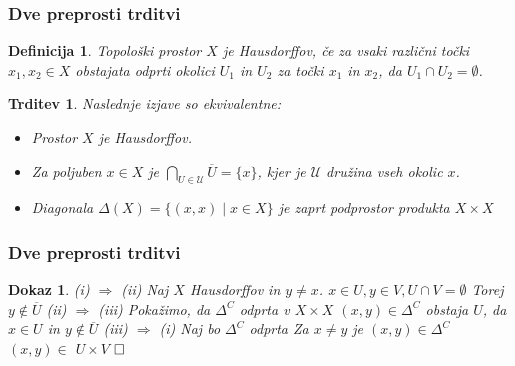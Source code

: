 \documentclass{beamer}
\def\qed{$\hfill\Box$}   %
\newtheorem{trditev}{Trditev}
\newtheorem{definicija}{Definicija}
\newtheorem{dokaz}{Dokaz}
\begin{document}
\begin{frame}
\frametitle{Dve preprosti trditvi}

\begin{definicija}
    Topološki prostor $X$ je \emph{Hausdorffov}, če za vsaki različni točki $x_1, x_2 \in X$ obstajata odprti okolici $U_1$ in $U_2$ za točki $x_1$ in $x_2$, da $U_1 \cap U_2 = \emptyset$.
\end{definicija}
\pause

\begin{trditev}
    Naslednje izjave so ekvivalentne:
    \pause
    \begin{itemize}
        \item[\rm (i)] Prostor $X$ je Hausdorffov.
        \pause 
        \item[\rm (ii)] Za poljuben $x \in X$ je $\bigcap_{U \in \mathcal{U}} \overline{U} = \{x\}$, kjer je $\mathcal{U}$ družina vseh okolic $x$.
        \pause 
        \item[\rm (iii)] Diagonala $\Delta(X) = \{(x,x) \mid x \in X \} $ je zaprt podprostor produkta $X \times X$
    \end{itemize}
\end{trditev}

\end{frame}

\begin{frame}
\frametitle{Dve preprosti trditvi}

\begin{dokaz}
    (i) $\Rightarrow$ (ii) Naj $X$ Hausdorffov in $y \neq x$.
    \newline
    \pause
    $x \in U, y \in V, U \cap V = \emptyset$
    \newline
    \pause
    Torej $y \notin \overline{U}$
    \bigskip
    \newline
    \pause
    (ii) $\Rightarrow$ (iii) Pokažimo, da $\Delta^C$ odprta v $X \times X$
    \newline
    \pause
    $(x,y) \in \Delta^C$ obstaja $U$, da $x \in U$ in $y \notin \overline{U}$
    \bigskip
    \newline
    \pause
    (iii) $\Rightarrow$ (i) Naj bo $\Delta^C$ odprta
    \newline
    \pause
    Za $x \neq y$ je $(x,y) \in \Delta^C$
    \newline
    \pause
    $(x,y) \in $ $U \times V$
    \pause
    \qed
\end{dokaz}

\end{frame}
\end{document}

